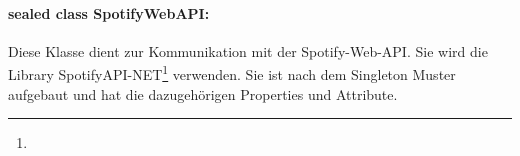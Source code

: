 \documentclass[../entwurf.tex]{subfiles}
\begin{document}
			\paragraph{sealed class SpotifyWebAPI:}
				Diese Klasse dient zur Kommunikation mit der Spotify-Web-API. Sie wird die Library 
				SpotifyAPI-NET\footnote{} verwenden. 
				Sie ist nach dem Singleton Muster aufgebaut und hat die dazugehörigen Properties und Attribute.
					
\end{document}
